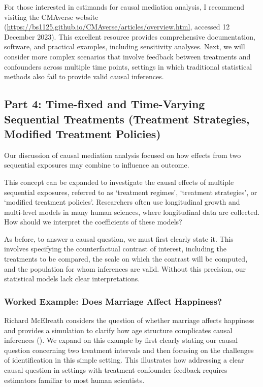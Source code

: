 \documentclass[
  single column]{article}
\begin{document}
For those interested in estimands for causal mediation analysis, I
recommend visiting the CMAverse website
(\url{https://bs1125.github.io/CMAverse/articles/overview.html},
accessed 12 December 2023). This excellent resource provides
comprehensive documentation, software, and practical examples, including
sensitivity analyses. Next, we will consider more complex scenarios that
involve feedback between treatments and confounders across multiple time
points, settings in which traditional statistical methods also fail to
provide valid causal inferences.

\subsection{Part 4: Time-fixed and Time-Varying Sequential Treatments
(Treatment Strategies, Modified Treatment Policies)}\label{id-sec-4}

Our discussion of causal mediation analysis focused on how effects from
two sequential exposures may combine to influence an outcome.

This concept can be expanded to investigate the causal effects of
multiple sequential exposures, referred to as `treatment regimes',
`treatment strategies', or `modified treatment policies'. Researchers
often use longitudinal growth and multi-level models in many human
sciences, where longitudinal data are collected. How should we interpret
the coefficients of these models?

As before, to answer a causal question, we must first clearly state it.
This involves specifying the counterfactual contrast of interest,
including the treatments to be compared, the scale on which the contrast
will be computed, and the population for whom inferences are valid.
Without this precision, our statistical models lack clear
interpretations.

\subsubsection{Worked Example: Does Marriage Affect
Happiness?}\label{worked-example-does-marriage-affect-happiness}

Richard McElreath considers the question of whether marriage affects
happiness and provides a simulation to clarify how age structure
complicates causal inferences (). We expand on this example by first clearly stating
our causal question concerning two treatment intervals and then focusing
on the challenges of identification in this simple setting. This
illustrates how addressing a clear causal question in settings with
treatment-confounder feedback requires estimators familiar to most human
scientists.
\end{document}
